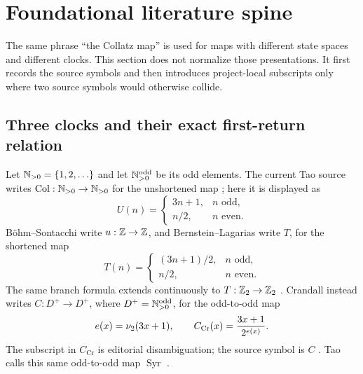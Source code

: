 \section{Foundational literature spine}
\label{sec:literature-spine}

The same phrase ``the Collatz map'' is used for maps with different state
spaces and different clocks.  This section does not normalize those
presentations.  It first records the source symbols and then introduces
project-local subscripts only where two source symbols would otherwise
collide.

\subsection{Three clocks and their exact first-return relation}

Let $\mathbb{N}_{>0}=\{1,2,\ldots\}$ and let $\mathbb{N}_{>0}^{\mathrm{odd}}$ be its odd elements.  The current
Tao source writes $\operatorname{Col}:\mathbb{N}_{>0}\to\mathbb{N}_{>0}$ for the unshortened map
\cite[Sec.~1.1]{Tao2026v7}; here it is displayed as
\begin{equation}
\label{eq:unshortened-U}
 U(n)=
 \begin{cases}
  3n+1,&n\text{ odd},\\
  n/2,&n\text{ even}.
 \end{cases}
\end{equation}
B\"ohm--Sontacchi write $u:\mathbb{Z}\to\mathbb{Z}$, and Bernstein--Lagarias write $T$, for
the shortened map
\begin{equation}
\label{eq:shortened-T}
 T(n)=
 \begin{cases}
  (3n+1)/2,&n\text{ odd},\\
  n/2,&n\text{ even}.
 \end{cases}
\end{equation}
The same branch formula extends continuously to $T:\mathbb{Z}_{2}\to\mathbb{Z}_{2}$
\cite[Eqs.~(1.1)--(1.3)]{BernsteinLagarias1996}.  Crandall instead writes
$C:D^+\to D^+$, where $D^+=\mathbb{N}_{>0}^{\mathrm{odd}}$, for the odd-to-odd map
\begin{equation}
\label{eq:crandall-C}
 e(x)=\nu_{2}(3x+1),
 \qquad
 C_{\mathrm{Cr}}(x)=\frac{3x+1}{2^{e(x)}}.
\end{equation}
The subscript in $C_{\mathrm{Cr}}$ is editorial disambiguation; the source
symbol is $C$ \cite[p.~1281, Eq.~(1.1)]{Crandall1978}.  Tao calls this same
odd-to-odd map $\operatorname{Syr}$ \cite[Sec.~1.2,
Eq.~(S-def)]{Tao2026v7}.

